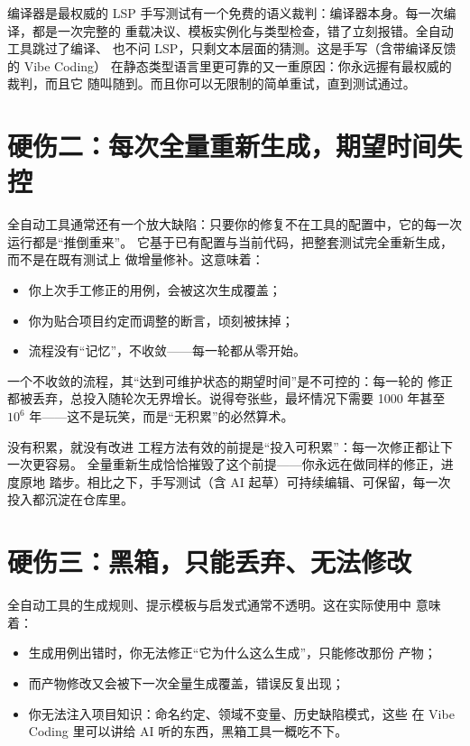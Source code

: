 \documentclass[12pt,a4paper,fontset=fandol]{ctexbook}
\begin{document}
\begin{note}{编译器是最权威的 LSP}
手写测试有一个免费的语义裁判：编译器本身。每一次编译，都是一次完整的
重载决议、模板实例化与类型检查，错了立刻报错。全自动工具跳过了编译、
也不问 LSP，只剩文本层面的猜测。这是手写（含带编译反馈的 Vibe Coding）
在静态类型语言里更可靠的又一重原因：你永远握有最权威的裁判，而且它
随叫随到。而且你可以无限制的简单重试，直到测试通过。
\end{note}

\section{硬伤二：每次全量重新生成，期望时间失控}

全自动工具通常还有一个放大缺陷：只要你的修复不在工具的配置中，它的每一次运行都是“推倒重来”。
它基于已有配置与当前代码，把整套测试完全重新生成，而不是在既有测试上
做增量修补。这意味着：

\begin{itemize}
  \item 你上次手工修正的用例，会被这次生成覆盖；
  \item 你为贴合项目约定而调整的断言，顷刻被抹掉；
  \item 流程没有“记忆”，不收敛——每一轮都从零开始。
\end{itemize}

一个不收敛的流程，其“达到可维护状态的期望时间”是不可控的：每一轮的
修正都被丢弃，总投入随轮次无界增长。说得夸张些，最坏情况下需要
1000 年甚至 $10^6$ 年——这不是玩笑，而是“无积累”的必然算术。

\begin{warning}{没有积累，就没有改进}
工程方法有效的前提是“投入可积累”：每一次修正都让下一次更容易。
全量重新生成恰恰摧毁了这个前提——你永远在做同样的修正，进度原地
踏步。相比之下，手写测试（含 AI 起草）可持续编辑、可保留，每一次
投入都沉淀在仓库里。
\end{warning}

\section{硬伤三：黑箱，只能丢弃、无法修改}

全自动工具的生成规则、提示模板与启发式通常不透明。这在实际使用中
意味着：

\begin{itemize}
  \item 生成用例出错时，你无法修正“它为什么这么生成”，只能修改那份
        产物；
  \item 而产物修改又会被下一次全量生成覆盖，错误反复出现；
  \item 你无法注入项目知识：命名约定、领域不变量、历史缺陷模式，这些
        在 Vibe Coding 里可以讲给 AI 听的东西，黑箱工具一概吃不下。
\end{itemize}
\end{document}
